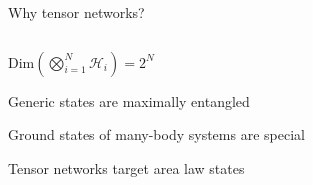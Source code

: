 \begin{frame}{Why tensor networks?}

 \begin{columns}
        \begin{column}{.5\textwidth}
        \bi
        \bi
        \item<2-> $\text{Dim} \left( \bigotimes\limits_{i=1}^{N} \mathcal{H}_i \right)= 2^N$
        \item <3-> Generic states are maximally entangled
        \ei
        \item <4-> Ground states of many-body systems are special
        \bi
        \item <5-> Tensor networks target area law states 
        \ei
        \ei
        \end{column}
        \begin{column}{.5\textwidth}%
        \end{column}
\end{columns}   


\end{frame}